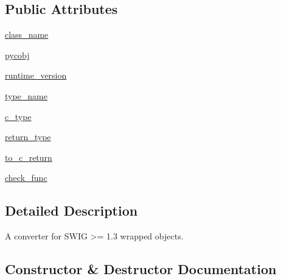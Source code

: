 \subsection*{Public Attributes}
\begin{DoxyCompactItemize}
\item 
\hyperlink{classscipy_1_1weave_1_1swig2__spec_1_1swig2__converter_ac44ab515f3b758884283d1edafb70f48}{class\+\_\+name}
\item 
\hyperlink{classscipy_1_1weave_1_1swig2__spec_1_1swig2__converter_a251c825926dad9dcee8084508920aa86}{pycobj}
\item 
\hyperlink{classscipy_1_1weave_1_1swig2__spec_1_1swig2__converter_aa1a38e1ce02a09aef0e0e9ef75075f28}{runtime\+\_\+version}
\item 
\hyperlink{classscipy_1_1weave_1_1swig2__spec_1_1swig2__converter_a43f771180ebff4c778ca263125ad67a7}{type\+\_\+name}
\item 
\hyperlink{classscipy_1_1weave_1_1swig2__spec_1_1swig2__converter_a516a954e88343deb8cc64a5be61154c8}{c\+\_\+type}
\item 
\hyperlink{classscipy_1_1weave_1_1swig2__spec_1_1swig2__converter_a6249c04238f45e0beb768f0c1b2f2502}{return\+\_\+type}
\item 
\hyperlink{classscipy_1_1weave_1_1swig2__spec_1_1swig2__converter_a7331a444de11efa86b38e35c35d0d9a7}{to\+\_\+c\+\_\+return}
\item 
\hyperlink{classscipy_1_1weave_1_1swig2__spec_1_1swig2__converter_aa5abc89b1fde000ca7df1bb041b0c305}{check\+\_\+func}
\end{DoxyCompactItemize}


\subsection{Detailed Description}
\begin{DoxyVerb}A converter for SWIG >= 1.3 wrapped objects.\end{DoxyVerb}
 

\subsection{Constructor \& Destructor Documentation}
\hypertarget{classscipy_1_1weave_1_1swig2__spec_1_1swig2__converter_a47881f32806badf01a20e8404b57a644}{}
